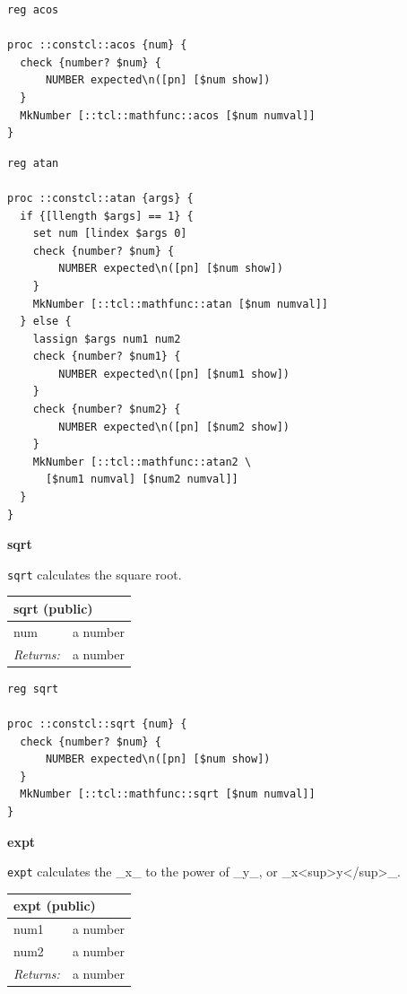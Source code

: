 \documentclass[twoside,9pt]{report}
\begin{document}
\noindent\makebox[\linewidth]{\rule{\linewidth}{0.4pt}}
\noindent\makebox[\linewidth]{\rule{\linewidth}{0.4pt}}
\begin{lstlisting}
reg acos
 
proc ::constcl::acos {num} {
  check {number? $num} {
      NUMBER expected\n([pn] [$num show])
  }
  MkNumber [::tcl::mathfunc::acos [$num numval]]
}
\end{lstlisting}
\noindent\makebox[\linewidth]{\rule{\linewidth}{0.4pt}}
\noindent\makebox[\linewidth]{\rule{\linewidth}{0.4pt}}
\begin{lstlisting}
reg atan
 
proc ::constcl::atan {args} {
  if {[llength $args] == 1} {
    set num [lindex $args 0]
    check {number? $num} {
        NUMBER expected\n([pn] [$num show])
    }
    MkNumber [::tcl::mathfunc::atan [$num numval]]
  } else {
    lassign $args num1 num2
    check {number? $num1} {
        NUMBER expected\n([pn] [$num1 show])
    }
    check {number? $num2} {
        NUMBER expected\n([pn] [$num2 show])
    }
    MkNumber [::tcl::mathfunc::atan2 \
      [$num1 numval] [$num2 numval]]
  }
}
\end{lstlisting}
\noindent\makebox[\linewidth]{\rule{\linewidth}{0.4pt}}

\textbf{sqrt}


\texttt{sqrt} calculates the square root.

\begin{tabular}{ |l l| }
\hline
\multicolumn{2}{|l|}{sqrt (public)} \\
\hline
num & a number \\
\textit{Returns:} & a number \\
\hline
\end{tabular}

\noindent\makebox[\linewidth]{\rule{\linewidth}{0.4pt}}
\begin{lstlisting}
reg sqrt
 
proc ::constcl::sqrt {num} {
  check {number? $num} {
      NUMBER expected\n([pn] [$num show])
  }
  MkNumber [::tcl::mathfunc::sqrt [$num numval]]
}
\end{lstlisting}
\noindent\makebox[\linewidth]{\rule{\linewidth}{0.4pt}}

\textbf{expt}


\texttt{expt} calculates the \_x\_ to the power of \_y\_, or \_x<sup>y</sup>\_.

\begin{tabular}{ |l l| }
\hline
\multicolumn{2}{|l|}{expt (public)} \\
\hline
num1 & a number \\
num2 & a number \\
\textit{Returns:} & a number \\
\hline
\end{tabular}
\end{document}
